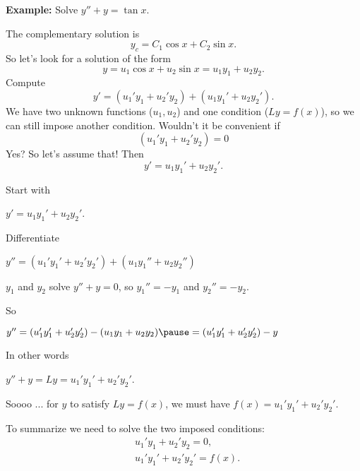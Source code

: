 \documentclass[10pt,aspectratio=169]{beamer}
\begin{document}
\begin{frame}
\textbf{Example:}
Solve $y''+y=\tan x$.

\medskip
\pause

The complementary solution is
\[
y_c = C_1 \cos x + C_2 \sin x .
\]
\pause
So let's look for a solution of the form
\[
y = u_1 \cos x + u_2 \sin x = u_1 y_1 + u_2 y_2 .
\]
\pause
Compute
\[
y' = (u_1' y_1 + u_2' y_2) + (u_1 y_1' + u_2 y_2').
\]
\pause
We have two unknown functions ($u_1,u_2$) and one condition ($Ly=f(x)$),
so we can still impose another condition.
\pause
Wouldn't it be convenient if
\[
(u_1' y_1 + u_2' y_2) = 0
\]
\pause
Yes?  So let's assume that!
\pause
Then
\[
y' = u_1 y_1' + u_2 y_2' .
\]

\end{frame}

\begin{frame}
Start with

\quad
$y' = u_1 y_1' + u_2 y_2'$.

\medskip
\pause

Differentiate

\quad
$y'' = (u_1' y_1' + u_2' y_2') + (u_1 y_1'' + u_2 y_2'')$

\medskip
\pause

$y_1$ and $y_2$ solve $y''+y = 0$, so $y_1'' = - y_1$ and $y_2'' = - y_2$.

\medskip
\pause

So

\quad
$y'' =
(u_1' y_1' + u_2' y_2') - (u_1 y_1 + u_2 y_2) 
\pause
=
(u_1' y_1' + u_2' y_2') - y
$

\medskip
\pause

In other words

\quad
$y'' + y = Ly = u_1' y_1' + u_2' y_2'$.

\medskip

\pause
Soooo ...  for $y$ to satisfy $Ly = f(x)$, we must have
$f(x) = u_1' y_1' + u_2' y_2'$.

\medskip
\pause

To summarize we need to solve the two imposed conditions:
\[
\boxed{~~
\begin{aligned}
& u_1' y_1 + u_2' y_2 = 0 ,\\
& u_1' y_1' + u_2' y_2' = f(x) .
\end{aligned}
~~}
\]

\end{frame}
\end{document}
